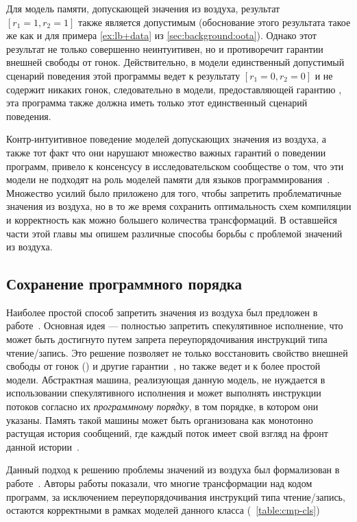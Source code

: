 Для модель памяти, допускающей значения из воздуха, 
результат ${[r_1=1, r_2=1]}$ также является допустимым
(обоснование этого результата такое же как и для 
примера \ref{ex:lb+data} из \cref{sec:background:oota}).
Однако этот результат не только совершенно неинтуитивен, 
но и противоречит гарантии внешней свободы от гонок. 
Действительно, в модели \SC единственный допустимый 
сценарий поведения этой программы ведет к результату $[r_1=0, r_2=0]$ 
и не содержит никаких гонок, следовательно 
в модели, предоставляющей гарантию \eDRF, 
эта программа также должна иметь только этот единственный 
сценарий поведения. 

Контр-интуитивное поведение моделей 
допускающих значения из воздуха, 
а также тот факт что они нарушают множество 
важных гарантий о поведении программ, 
привело к консенсусу в исследовательском сообществе о том, 
что эти модели не подходят на роль моделей памяти 
для языков программирования~\cite{Boehm-Demsky:MSPC14, Batty-al:ESOP15}.  
Множество усилий было приложено для того, 
чтобы запретить проблематичные значения из воздуха, 
но в то же время сохранить оптимальность схем 
компиляции и корректность как можно большего количества трансформаций. 
В оставшейся части этой главы мы опишем различные 
способы борьбы с проблемой значений из воздуха. 

\subsection{Сохранение программного порядка}
\label{sec:analysis:porf}

Наиболее простой способ запретить значения из воздуха 
был предложен в работе~\cite{Boehm-Demsky:MSPC14}.
Основная идея --- полностью запретить спекулятивное исполнение, 
что может быть достигнуто путем запрета переупорядочивания 
инструкций типа чтение/запись. 
Это решение позволяет не только восстановить 
свойство внешней свободы от гонок (\eDRF) 
и другие гарантии~\cite{Lahav-al:PLDI17}, 
но также ведет и к более простой модели. 
Абстрактная машина, реализующая данную модель, 
не нуждается в использовании спекулятивного исполнения
и может выполнять инструкции потоков согласно их
\emph{программному порядку}, \ie в том порядке, в котором они указаны. 
Память такой машины может быть организована 
как монотонно растущая история сообщений, 
где каждый поток имеет свой взгляд на 
фронт данной истории~\cite{Dolan-al:PLDI18, Doherty-al:PPoPP19}. 

Данный подход к решению проблемы значений из воздуха 
был формализован в работе~\cite{Lahav-al:PLDI17}.
Авторы работы показали, что многие трансформации над 
кодом программ, за исключением переупорядочивания 
инструкций типа чтение/запись, остаются корректными в рамках 
моделей данного класса (\see~\cref{table:cmp-cls})

